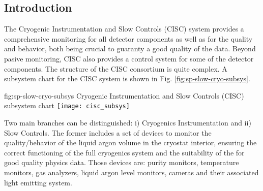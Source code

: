 \subsection{Introduction}
\label{sec:fdsp-slow-cryo-intro}



The Cryogenic Instrumentation and Slow Controls (CISC) system provides
a comprehensive monitoring for all detector components as well as for the  quality and behavior, both being crucial
to guaranty a good quality of the data. Beyond pasive monitoring, CISC also provides a control system for some of the detector components. 
The structure of the CISC consortium is quite complex. A subsystem chart
for the CISC system is shown in Fig. \ref{fig:sp-slow-cryo-subsys}. 

\begin{dunefigure}{fig:sp-slow-cryo-subsys}
{Cryogenic Instrumentation and Slow Controls (CISC) subsystem chart}
\texttt{[image: cisc\_subsys]}
\end{dunefigure}

Two main branches can be distinguished: i) Cryogenics Instrumentation and ii) Slow Controls. The former includes a set of devices 
to monitor the quality/behavior of the liquid argon volume in the cryostat interior, ensuring the correct functioning of
the full cryogenics system and the suitability of the  for good quality physics data. Those devices are:
purity monitors, temperature monitors, gas analyzers, liquid argon level monitors, cameras and their associated
light emitting system.

